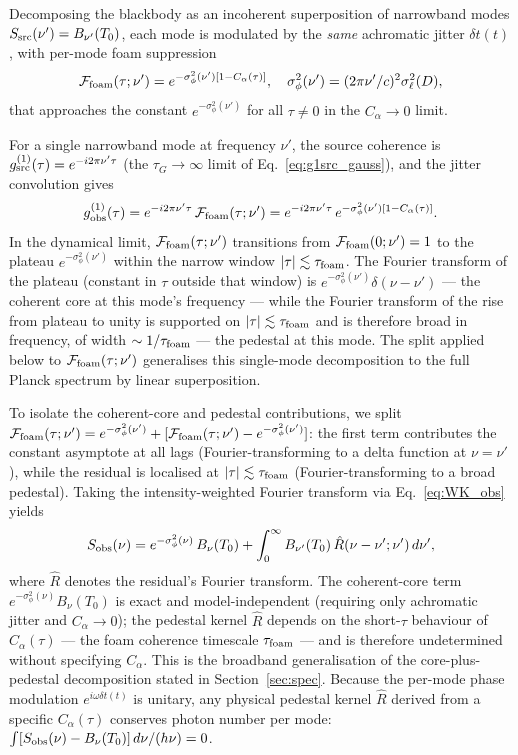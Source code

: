 \documentclass[aps,prd,onecolumn,amsmath,amssymb]{revtex4-2}
\begin{document}
Decomposing the blackbody as an incoherent superposition of narrowband
modes $S_{\rm src}(\nu')=B_{\nu'}(T_0)$, each mode is modulated by the
\emph{same} achromatic jitter $\delta t(t)$, with per-mode foam suppression
\begin{equation}
  \mathcal{F}_{\rm foam}(\tau;\nu')
    = e^{-\sigma_\phi^2(\nu')[1-C_\alpha(\tau)]},
  \quad
  \sigma_\phi^2(\nu')=(2\pi\nu'/c)^2\sigma_\ell^2(D),
\end{equation}
that approaches the constant $e^{-\sigma_\phi^2(\nu')}$ for all
$\tau\neq 0$ in the $C_\alpha\to 0$ limit.

For a single narrowband mode at frequency $\nu'$, the source
coherence is $g^{(1)}_{\rm src}(\tau)=e^{-i2\pi\nu'\tau}$ (the
$\tau_G\to\infty$ limit of Eq.~\eqref{eq:g1src_gauss}), and the
jitter convolution gives
\[
  g^{(1)}_{\rm obs}(\tau)
    = e^{-i2\pi\nu'\tau}\,\mathcal{F}_{\rm foam}(\tau;\nu')
    = e^{-i2\pi\nu'\tau}\,e^{-\sigma_\phi^2(\nu')[1-C_\alpha(\tau)]}.
\]
In the dynamical limit, $\mathcal{F}_{\rm foam}(\tau;\nu')$
transitions from $\mathcal{F}_{\rm foam}(0;\nu')=1$ to the plateau
$e^{-\sigma_\phi^2(\nu')}$ within the narrow window
$|\tau|\lesssim\tau_{\rm foam}$.  The Fourier transform of the
plateau (constant in $\tau$ outside that window) is
$e^{-\sigma_\phi^2(\nu')}\delta(\nu-\nu')$ --- the coherent core at
this mode's frequency --- while the Fourier transform of the rise
from plateau to unity is supported on $|\tau|\lesssim\tau_{\rm foam}$
and is therefore broad in frequency, of width
$\sim 1/\tau_{\rm foam}$ --- the pedestal at this mode.  The split
applied below to $\mathcal{F}_{\rm foam}(\tau;\nu')$ generalises this
single-mode decomposition to the full Planck spectrum by linear
superposition.

To isolate the coherent-core
and pedestal contributions, we split
$\mathcal{F}_{\rm foam}(\tau;\nu')=e^{-\sigma_\phi^2(\nu')}+
[\mathcal{F}_{\rm foam}(\tau;\nu')-e^{-\sigma_\phi^2(\nu')}]$: the
first term contributes the constant asymptote at all lags
(Fourier-transforming to a delta function at $\nu=\nu'$), while the
residual is localised at $|\tau|\lesssim\tau_{\rm foam}$
(Fourier-transforming to a broad pedestal).  Taking the
intensity-weighted Fourier transform via Eq.~\eqref{eq:WK_obs} yields
\begin{equation}
  S_{\rm obs}(\nu)
    = e^{-\sigma_\phi^2(\nu)}\,B_\nu(T_0)
    + \int_0^\infty B_{\nu'}(T_0)\,\hat{R}(\nu-\nu';\nu')\,d\nu',
  \label{eq:CMB_spectrum}
\end{equation}
where $\hat{R}$ denotes the residual's Fourier transform.  The
coherent-core term $e^{-\sigma_\phi^2(\nu)}B_\nu(T_0)$ is exact and
model-independent (requiring only achromatic jitter and
$C_\alpha\to 0$); the pedestal kernel $\hat{R}$ depends on the
short-$\tau$ behaviour of $C_\alpha(\tau)$ --- the foam coherence
timescale $\tau_{\rm foam}$ --- and is therefore undetermined without
specifying $C_\alpha$.  This is the broadband generalisation of the
core-plus-pedestal decomposition stated in Section~\ref{sec:spec}.
Because the per-mode phase modulation $e^{i\omega\delta t(t)}$ is
unitary, any physical pedestal kernel $\hat{R}$ derived from a
specific $C_\alpha(\tau)$ conserves photon number per mode:
$\int [S_{\rm obs}(\nu)-B_\nu(T_0)]\,d\nu/(h\nu)=0$.
\end{document}
